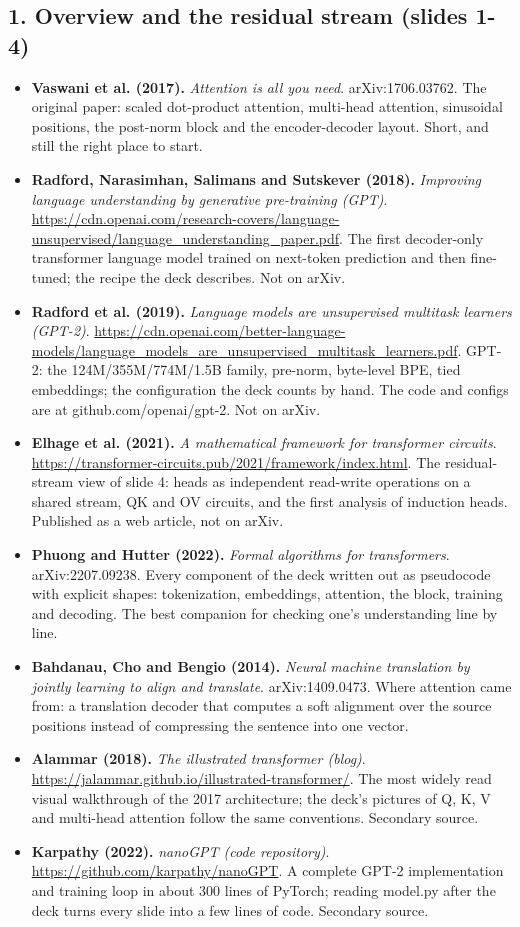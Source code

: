 \documentclass[11pt,letterpaper]{article}
\begin{document}
\subsection*{1. Overview and the residual stream (slides 1-4)}
\begin{itemize}[leftmargin=1.2em,itemsep=3pt]\sloppy
\item \textbf{Vaswani et al. (2017).} \textit{Attention is all you need}. arXiv:1706.03762. The original paper: scaled dot-product attention, multi-head attention, sinusoidal positions, the post-norm block and the encoder-decoder layout. Short, and still the right place to start.
\item \textbf{Radford, Narasimhan, Salimans and Sutskever (2018).} \textit{Improving language understanding by generative pre-training (GPT)}. \url{https://cdn.openai.com/research-covers/language-unsupervised/language_understanding_paper.pdf}. The first decoder-only transformer language model trained on next-token prediction and then fine-tuned; the recipe the deck describes. Not on arXiv.
\item \textbf{Radford et al. (2019).} \textit{Language models are unsupervised multitask learners (GPT-2)}. \url{https://cdn.openai.com/better-language-models/language_models_are_unsupervised_multitask_learners.pdf}. GPT-2: the 124M/355M/774M/1.5B family, pre-norm, byte-level BPE, tied embeddings; the configuration the deck counts by hand. The code and configs are at github.com/openai/gpt-2. Not on arXiv.
\item \textbf{Elhage et al. (2021).} \textit{A mathematical framework for transformer circuits}. \url{https://transformer-circuits.pub/2021/framework/index.html}. The residual-stream view of slide 4: heads as independent read-write operations on a shared stream, QK and OV circuits, and the first analysis of induction heads. Published as a web article, not on arXiv.
\item \textbf{Phuong and Hutter (2022).} \textit{Formal algorithms for transformers}. arXiv:2207.09238. Every component of the deck written out as pseudocode with explicit shapes: tokenization, embeddings, attention, the block, training and decoding. The best companion for checking one's understanding line by line.
\item \textbf{Bahdanau, Cho and Bengio (2014).} \textit{Neural machine translation by jointly learning to align and translate}. arXiv:1409.0473. Where attention came from: a translation decoder that computes a soft alignment over the source positions instead of compressing the sentence into one vector.
\item \textbf{Alammar (2018).} \textit{The illustrated transformer (blog)}. \url{https://jalammar.github.io/illustrated-transformer/}. The most widely read visual walkthrough of the 2017 architecture; the deck's pictures of Q, K, V and multi-head attention follow the same conventions. Secondary source.
\item \textbf{Karpathy (2022).} \textit{nanoGPT (code repository)}. \url{https://github.com/karpathy/nanoGPT}. A complete GPT-2 implementation and training loop in about 300 lines of PyTorch; reading model.py after the deck turns every slide into a few lines of code. Secondary source.
\end{itemize}
\end{document}
